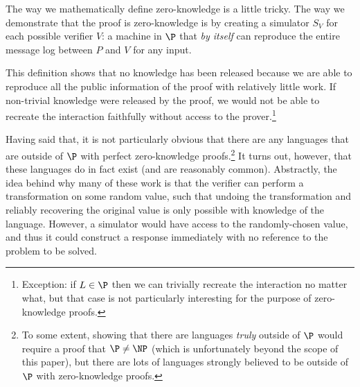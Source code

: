 \documentclass[english,12pt]{reedthesis}
\theoremstyle{plain}
\theoremstyle{definition}
\theoremstyle{remark}
\begin{document}
The way we mathematically define zero-knowledge is a little tricky. The way we
demonstrate that the proof is zero-knowledge is by creating a simulator $S_{V}$
for each possible verifier $V$: a machine in $\P$ that \emph{by itself} can
reproduce the entire message log between $P$ and $V$ for any input.

This definition shows that no knowledge has been released because we are able to
reproduce all the public information of the proof with relatively little work.
If non-trivial knowledge were released by the proof, we would not be able to
recreate the interaction faithfully without access to the
prover.\footnote{Exception: if $L \in \P$ then we can trivially recreate the
  interaction no matter what, but that case is not particularly interesting for
  the purpose of zero-knowledge proofs.}

Having said that, it is not particularly obvious that there are any languages
that are outside of $\P$ with perfect zero-knowledge proofs.\footnote{To some
  extent, showing that there are languages \emph{truly} outside of $\P$ would
  require a proof that $\P \ne \NP$ (which is unfortunately beyond the scope of
  this paper), but there are lots of languages strongly believed to be outside
  of $\P$ with zero-knowledge proofs.} It turns out, however, that these
languages do in fact exist (and are reasonably common). Abstractly, the idea
behind why many of these work is that the verifier can perform a transformation
on some random value, such that undoing the transformation and reliably
recovering the original value is only possible with knowledge of the language.
However, a simulator would have access to the randomly-chosen value, and thus it
could construct a response immediately with no reference to the problem to be
solved.
\end{document}
